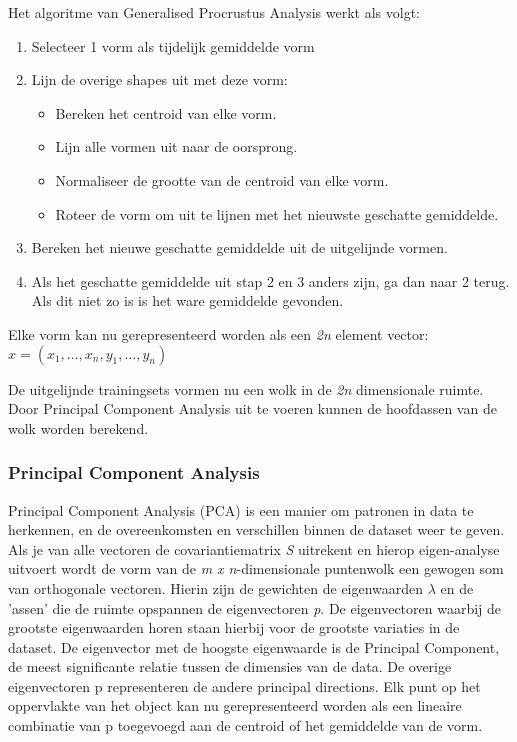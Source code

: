 Het algoritme van Generalised Procrustus Analysis werkt als volgt\cite{gpa}:
\begin{enumerate}
	\item Selecteer 1 vorm als tijdelijk gemiddelde vorm
	\item Lijn de overige shapes uit met deze vorm:
	\begin{itemize}
		\item Bereken het centroid van elke vorm.
		\item Lijn alle vormen uit naar de oorsprong.
		\item Normaliseer de grootte van de centroid van elke vorm.
		\item Roteer de vorm om uit te lijnen met het nieuwste geschatte gemiddelde.
	\end{itemize}
	\item Bereken het nieuwe geschatte gemiddelde uit de uitgelijnde vormen.
	\item Als het geschatte gemiddelde uit stap 2 en 3 anders zijn, ga dan naar 2 terug. Als dit niet zo is is het ware gemiddelde gevonden.
\end{enumerate}

Elke vorm kan nu gerepresenteerd worden als een \textit{2n} element vector:
$x = (x_{1},...,x_{n},y_{1},...,y_{n})$

De uitgelijnde trainingsets vormen nu een wolk in de \textit{2n} dimensionale ruimte. 
Door Principal Component Analysis uit te voeren kunnen de hoofdassen van de wolk worden berekend.

\subsubsection{Principal Component Analysis}

Principal Component Analysis (PCA) is een manier om patronen in data te herkennen, en de overeenkomsten en verschillen binnen de dataset weer te geven.\cite{pca}
Als je van alle vectoren de covariantiematrix \textit{S} uitrekent en hierop eigen-analyse uitvoert wordt de vorm van de \textit{m x n}-dimensionale puntenwolk een gewogen som van orthogonale vectoren. 
Hierin zijn de gewichten de eigenwaarden $\lambda$ en de 'assen' die de ruimte opspannen de eigenvectoren \textit{p}. 
De eigenvectoren waarbij de grootste eigenwaarden horen staan hierbij voor de grootste variaties in de dataset. 
De eigenvector met de hoogste eigenwaarde is de Principal Component, de meest significante relatie tussen de dimensies van de data. 
De overige eigenvectoren p representeren de andere principal directions. Elk punt op het oppervlakte van het object kan nu gerepresenteerd worden als een lineaire combinatie van p toegevoegd aan de centroid of het gemiddelde van de vorm.

